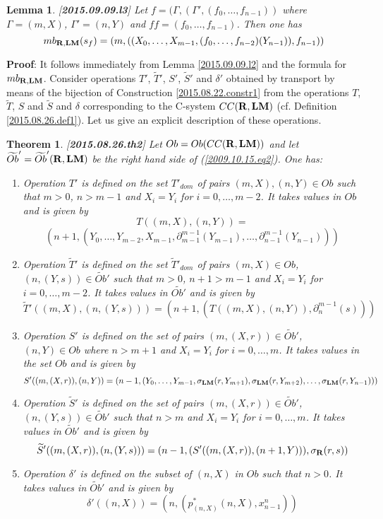 \documentclass[11pt]{article}
\newenvironment{proof}{{\bf Proof}:}{\vskip 5mm }
\newtheorem{lemma}[proposition]{Lemma}
\newtheorem{theorem}[proposition]{Theorem}
\newcommand{\llabel}[1]{\label{#1}[{\bf #1}]}
\newcommand{\rr}{{\bf R}}
\newcommand{\lm}{{\bf LM}}
\newcommand{\wt}{\widetilde}
\begin{document}
%
\begin{lemma}
\llabel{2015.09.09.l3}
Let $f=(\Gamma,(\Gamma',(f_0,\dots,f_{n-1}))$ where $\Gamma=(m,X)$, $\Gamma'=(n,Y)$ and $ff=(f_0,\dots,f_{n-1})$. Then one has
%
$$mb_{\rr,\lm}(s_f)=(m,((X_0,\dots,X_{m-1},(f_0,\dots,f_{n-2})(Y_{n-1})), f_{n-1}))$$
%
\end{lemma}
%
\begin{proof}
It follows immediately from Lemma \ref{2015.09.09.l2} and the formula for $mb_{\rr,\lm}$.
\end{proof}
%
Consider operations $T'$, $\wt{T}'$, $S'$, $\wt{S}'$ and $\delta'$ obtained by transport by means of the bijection of Construction \ref{2015.08.22.constr1} from the operations $T$, $\wt{T}$, $S$ and $\wt{S}$ and $\delta$ corresponding to the C-system $CC(\rr,\lm)$ (cf. Definition \ref{2015.08.26.def1}).  Let us give an explicit description of these operations. 
%
\begin{theorem}\llabel{2015.08.26.th2}
Let $Ob=Ob(CC(\rr,\lm))$ and let $\wt{Ob}'=\wt{Ob}'(\rr,\lm)$ be the right hand side of (\ref{2009.10.15.eq2}). One has:
%
\begin{enumerate}
\item Operation $T'$ is defined on the set $T'_{dom}$ of pairs $(m,X),(n,Y)\in Ob$ such that $m>0$, $n>m-1$ and $X_i=Y_i$ for $i=0,\dots,m-2$. It takes values in $Ob$ and is given by 
%
$$T((m,X),(n,Y))=$$$$(n+1,(Y_0,\dots,Y_{m-2},X_{m-1},\partial_{m-1}^{m-1}(Y_{m-1}),\dots,\partial_{n-1}^{m-1}(Y_{n-1})))$$
%
\item Operation $\wt{T}'$ is defined on the set $\wt{T}'_{dom}$ of pairs $(m,X)\in Ob$, $(n,(Y,s))\in\wt{Ob}'$ such that $m>0$, $n+1>m-1$ and $X_i=Y_i$ for $i=0,\dots,m-2$. It takes values in $\wt{Ob'}$ and is given by
%
$$\wt{T}'((m,X),(n,(Y,s)))=(n+1,(T((m,X),(n,Y)),\partial_{n}^{m-1}(s)))$$
%
\item Operation $S'$ is defined on the set of pairs $(m,(X,r))\in \wt{Ob}'$, $(n,Y)\in Ob$ where $n>m+1$ and $X_i=Y_i$ for $i=0,\dots,m$. It takes values in the set $Ob$ and is given by 
%
$$S'((m,(X,r)),(n,Y))=(n-1,(Y_0,\dots,Y_{m-1},\sigma_{\lm}(r,Y_{m+1}),\sigma_{\lm}(r,Y_{m+2}),\dots,\sigma_{\lm}(r,Y_{n-1})))$$
%
\item Operation $\wt{S}'$ is defined on the set of pairs $(m,(X,r))\in \wt{Ob}'$, $(n,(Y,s))\in \wt{Ob}'$ such that $n>m$ and $X_i=Y_i$ for $i=0,\dots,m$. It takes values in $\wt{Ob}'$ and is given by 
%
$$\wt{S}'((m,(X,r)),(n,(Y,s)))=(n-1,(S'((m,(X,r)),(n+1,Y))),\sigma_{\rr}(r,s))$$
%
\item Operation $\delta'$ is defined on the subset of $(n,X)$ in $Ob$ such that $n>0$. It takes values in $\wt{Ob}'$ and is given by 
%
$$\delta'((n,X))=(n,(p_{(n,X)}^*(n,X),x_{n-1}^n))$$
%
\end{enumerate}
\end{theorem}
\end{document}
